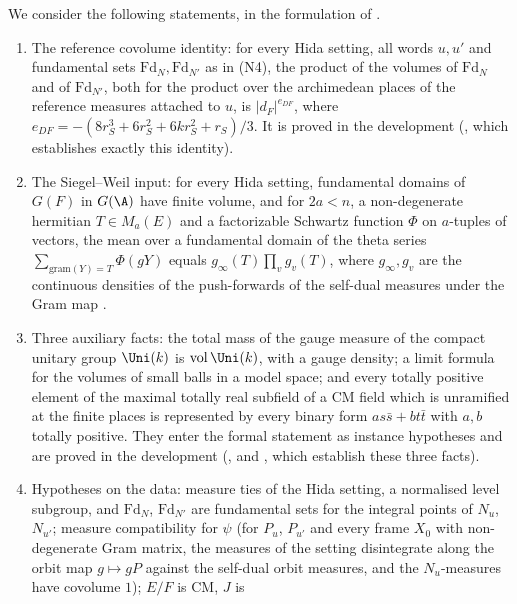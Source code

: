 \begin{hypothesis}\label{pf:multnc:hyp-nc}
We consider the following statements, in the formulation of \cite{LeanSource2026}.
\begin{enumerate}[label=(N\arabic*)]
\item The reference covolume identity: for every Hida setting, all words $u,u'$ and fundamental sets
$\mathrm{Fd}_N,\mathrm{Fd}_{N'}$ as in (N4), the product of the volumes of $\mathrm{Fd}_N$ and of $\mathrm{Fd}_{N'}$, both for
the product over the archimedean places of the reference measures attached to $u$, is $|d_F|^{e_{DF}}$, where
$e_{DF}=-(8r_S^3+6r_S^2+6kr_S^2+r_S)/3$. It is proved in the development
(, which establishes exactly this identity).
\item The Siegel--Weil input: for every Hida setting, fundamental domains of $G(F)$ in $G(\A)$ have finite volume, and for
$2a<n$, a non-degenerate hermitian $T\in M_a(E)$ and a factorizable Schwartz function $\Phi$ on $a$-tuples of vectors, the
mean over a fundamental domain of the theta series $\sum_{\mathrm{gram}(Y)=T}\Phi(gY)$ equals $g_\infty(T)\prod_vg_v(T)$,
where $g_\infty,g_v$ are the continuous densities of the push-forwards of the self-dual measures under the Gram map
\cite{Weil1965}.
\item Three auxiliary facts: the total mass of the gauge measure of the compact unitary group $\Uni(k)$ is
$\mathrm{vol}\,\Uni(k)$, with a gauge density; a limit formula for the volumes of small balls in a model space; and every
totally positive element of the maximal totally real subfield of a CM field which is unramified at the finite places is
represented by every binary form $as\bar s+bt\bar t$ with $a,b$ totally positive. They enter the formal statement as
instance hypotheses and are proved in the development (,
 and , which establish these three
facts).
\item Hypotheses on the data: measure ties of the Hida setting, a normalised level subgroup, and $\mathrm{Fd}_N$,
$\mathrm{Fd}_{N'}$ are fundamental sets for the integral points of $N_u$, $N_{u'}$; measure compatibility for $\psi$ (for
$P_u$, $P_{u'}$ and every frame $X_0$ with non-degenerate Gram matrix, the measures of the setting disintegrate along the
orbit map $g\mapsto gP$ against the self-dual orbit measures, and the $N_u$-measures have covolume $1$); $E/F$ is CM, $J$ is

\end{enumerate}
\end{hypothesis}
